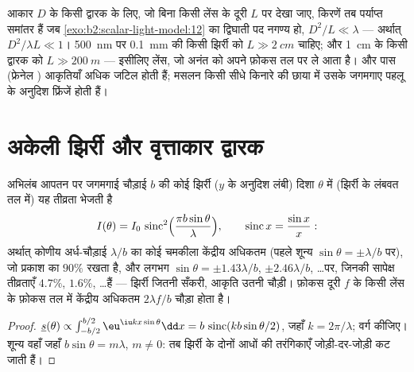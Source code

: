 \begin{remark}[कितना दूर काफ़ी दूर है?]\label{rem:b2:diffraction:fresnelnumber}
आकार $D$ के किसी द्वारक के लिए, जो बिना किसी लेंस के दूरी $L$ पर देखा जाए,
किरणें तब पर्याप्त समांतर हैं जब
\cref{exo:b2:scalar-light-model:12} का द्विघाती पद नगण्य हो, $D^2/L \ll \lambda$ ---
अर्थात् \emph{} $D^2/\lambda L \ll 1$। \qty{500}{nm} पर \qty{0.1}{mm} की किसी झिर्री
को $L \gg \qty{2}{cm}$ चाहिए; और \qty{1}{cm} के किसी द्वारक को $L \gg \qty{200}{m}$ ---
इसीलिए लेंस, जो अनंत को अपने फ़ोकस तल पर ले आता है। और पास
(फ्रेनेल ) आकृतियाँ अधिक जटिल होती हैं; मसलन किसी सीधे किनारे की
छाया में उसके जगमगाए पहलू के अनुदिश फ्रिंजें होती हैं।
\end{remark}

\section{अकेली झिर्री और वृत्ताकार द्वारक}

\begin{proposition}[किसी झिर्री से विवर्तन]\label{prop:b2:diffraction:slit}
अभिलंब आपतन पर जगमगाई चौड़ाई $b$ की कोई झिर्री ($y$ के अनुदिश लंबी)
दिशा $\theta$ में (झिर्री के लंबवत तल में) यह
तीव्रता भेजती है
\[
I(\theta) = I_0\,\operatorname{sinc}^2\Bigl(\frac{\pi b\sin\theta}\lambda\Bigr) , \qquad \operatorname{sinc}x = \frac{\sin x}x :
\]
अर्थात् कोणीय अर्ध-चौड़ाई $\lambda/b$ का कोई चमकीला केंद्रीय अधिकतम (पहले शून्य
$\sin\theta = \pm\lambda/b$ पर), जो प्रकाश का $90\%$ रखता है, और 
लगभग $\sin\theta = \pm1.43\lambda/b$, $\pm2.46\lambda/b$, \dots पर, जिनकी सापेक्ष
तीव्रताएँ $4.7\%$, $1.6\%$, \dots हैं --- झिर्री जितनी सँकरी, आकृति उतनी चौड़ी।
फ़ोकस दूरी $f$ के किसी लेंस के फ़ोकस तल में
केंद्रीय अधिकतम $2\lambda f/b$ चौड़ा होता है।
\end{proposition}

\begin{proof}
$\underline s(\theta) \propto \int_{-b/2}^{b/2}\eu^{\iu kx\sin\theta}\dd x = b\,\operatorname{sinc}(kb\sin\theta/2)$,
जहाँ $k = 2\pi/\lambda$; वर्ग कीजिए। शून्य वहाँ जहाँ $b\sin\theta = m\lambda$, $m \ne 0$: तब झिर्री के
दोनों आधों की तरंगिकाएँ जोड़ी-दर-जोड़ी कट जाती हैं।
\end{proof}

